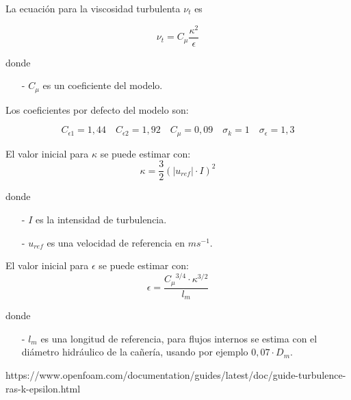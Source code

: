 La ecuación para la viscosidad turbulenta $\nu_{t}$ es

\begin{equation}\label{eq:nu_t} \nu_{t} = C_{\mu}\frac{\kappa^{2}}{\epsilon}
\end{equation}


donde
\begin{itemize}
        \item[-] $C_{\mu}$ es un coeficiente del modelo.
\end{itemize}

Los coeficientes por defecto del modelo son:

\begin{equation} C_{\epsilon 1}=1,44 \quad C_{\epsilon 2}=1,92 \quad C_{\mu}=0,09 \quad \sigma_{k}=1 \quad \sigma_{\epsilon}=1,3
\end{equation}

El valor inicial para $\kappa$ se puede estimar con:
\begin{equation}\label{eq:kappa_est} \kappa = \frac{3}{2} {\left( |u_{ref}| \cdot I \right)}^{2}
\end{equation}


donde
\begin{itemize}
  \item[-] $I$ es la intensidad de turbulencia.
  \item[-] $u_{ref}$ es una velocidad de referencia en $ms^{-1}$.
\end{itemize}

El valor inicial para $\epsilon$ se puede estimar con:
\begin{equation}\label{eq:epsilon_est} \epsilon = \frac{{C_{\mu}}^{3/4} \cdot {\kappa}^{3/2}} {l_{m}}
\end{equation}

donde
\begin{itemize}
 \item[-] $l_{m}$ es una longitud de referencia, para flujos internos se estima
con el diámetro hidráulico de la cañería, usando por ejemplo $0,07 \cdot D_{m}$.
\end{itemize}


%
https://www.openfoam.com/documentation/guides/latest/doc/guide-turbulence-ras-k-epsilon.html

